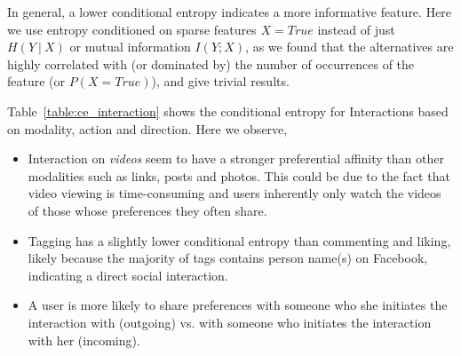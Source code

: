 In general, a lower conditional entropy indicates a more informative
feature. Here we use entropy conditioned on sparse features $X=True$ 
instead of just $H(Y~|~X)$ or mutual information $I(Y; X)$, as we found 
that the alternatives are highly correlated with (or dominated by) the number of 
occurrences of the feature (or $P(X=True)$), and give trivial results. 

Table~\ref{table:ce_interaction} shows the conditional entropy for Interactions based on modality, action and direction. Here we observe,
\begin{itemize}
\item Interaction on {\em videos} seem to have a stronger preferential affinity 
than other modalities such as links, posts and photos.  This could be
  due to the fact that video viewing is time-consuming and users
  inherently only watch the videos of those whose preferences they
  often share.
\item Tagging has a slightly lower conditional entropy than
  commenting and liking, likely because the majority of tags contains 
  person name(s) on Facebook, indicating a direct social interaction. 
\item A user is more likely to share preferences with someone who she
  initiates the interaction with (outgoing) vs. with someone who
  initiates the interaction with her (incoming).  
\end{itemize}


